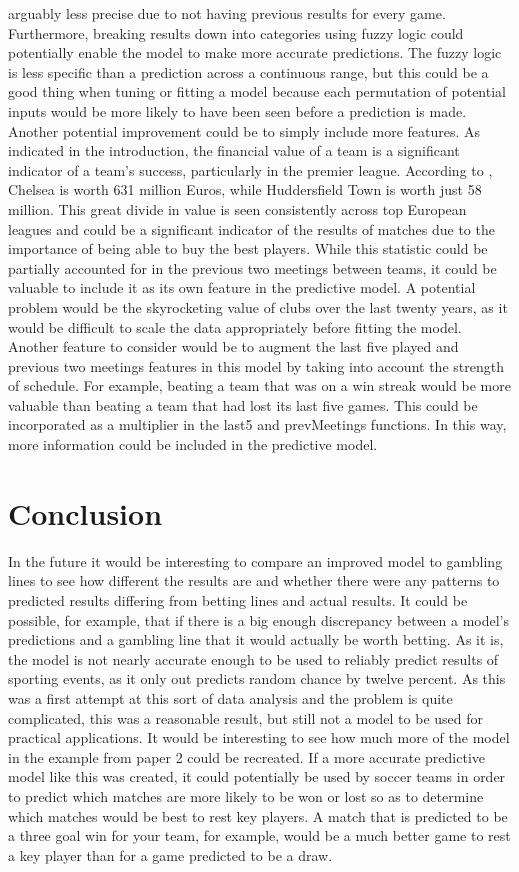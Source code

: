 \documentclass[sigconf]{acmart}
\begin{document}
arguably less precise due to not having previous results for every game. Furthermore, breaking results down into categories using fuzzy logic could potentially enable the model to make more accurate predictions. The fuzzy logic is less specific than a prediction across a continuous range, but this could be a good thing when tuning or fitting a model because each permutation of potential inputs would be more likely to have been seen before a prediction is made. 
Another potential improvement could be to simply include more features. As indicated in the introduction, the financial value of a team is a significant indicator of a team's success, particularly in the premier league. According to \cite{TransferMarkt}, Chelsea is worth 631 million Euros, while Huddersfield Town is worth just 58 million. This great divide in value is seen consistently across top European leagues and could be a significant indicator of the results of matches due to the importance of being able to buy the best players. While this statistic could be partially accounted for in the previous two meetings between teams, it could be valuable to include it as its own feature in the predictive model. A potential problem would be the skyrocketing value of clubs over the last twenty years, as it would be difficult to scale the data appropriately before fitting the model.
Another feature to consider would be to augment the last five played and previous two meetings features in this model by taking into account the strength of schedule. For example, beating a team that was on a win streak would be more valuable than beating a team that had lost its last five games. This could be incorporated as a multiplier in the last5 and prevMeetings functions. In this way, more information could be included in the predictive model.

\section{Conclusion}
In the future it would be interesting to compare an improved model to gambling lines to see how different the results are and whether there were any patterns to predicted results differing from betting lines and actual results. It could be possible, for example, that if there is a big enough discrepancy between a model's predictions and a gambling line that it would actually be worth betting. As it is, the model is not nearly accurate enough to be used to reliably predict results of sporting events, as it only out predicts random chance by twelve percent. As this was a first attempt at this sort of data analysis and the problem is quite complicated, this was a reasonable result, but still not a model to be used for practical applications. It would be interesting to see how much more of the model in the example from paper 2 could be recreated. If a more accurate predictive model like this was created, it could potentially be used by soccer teams in order to predict which matches are more likely to be won or lost so as to determine which matches would be best to rest key players. A match that is predicted to be a three goal win for your team, for example, would be a much better game to rest a key player than for a game predicted to be a draw. 
\end{document}
